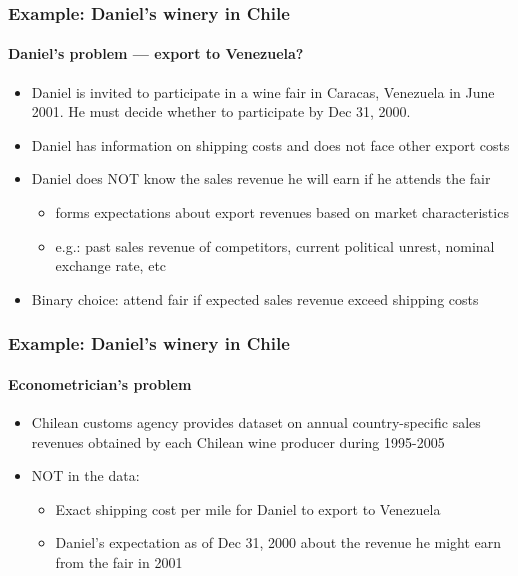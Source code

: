 \documentclass[10pt,letterpaper]{beamer}
\begin{document}

\begin{frame}
\frametitle{Example: Daniel's winery in Chile} \framesubtitle{Daniel's
problem --- export to Venezuela?}

\begin{itemize}
\item Daniel is invited to participate in a wine fair in Caracas, Venezuela
in June 2001. He must decide whether to participate by Dec 31, 2000.

\item Daniel has information on shipping costs and does not face other
export costs

\item Daniel does NOT know the sales revenue he will earn if he attends the
fair

\begin{itemize}
\item forms expectations about export revenues based on market
characteristics 

\item e.g.: past sales revenue of competitors, current political unrest,
nominal exchange rate, etc
\end{itemize}

\item Binary choice: attend fair if expected sales revenue exceed shipping
costs
\end{itemize}
\end{frame}


\begin{frame}
\frametitle{Example: Daniel's winery in Chile} %
\framesubtitle{Econometrician's problem}

\begin{itemize}
\item Chilean customs agency provides dataset on annual country-specific
sales revenues obtained by each Chilean wine producer during 1995-2005

\item NOT in the data: 

\begin{itemize}
\item Exact shipping cost per mile for Daniel to export to Venezuela 

\item Daniel's expectation as of Dec 31, 2000 about the revenue he might
earn from the fair in 2001 
\end{itemize}
\end{itemize}
\end{frame}
\end{document}
